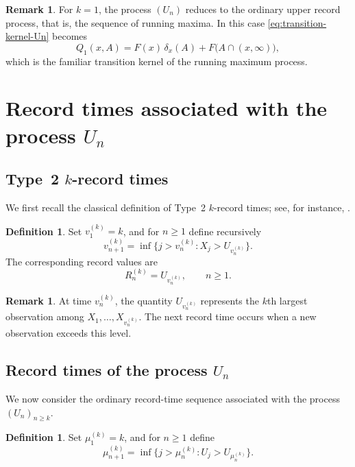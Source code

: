 \documentclass[12pt]{article}
\theoremstyle{definition}
\newtheorem{definition}[theorem]{Definition}
\newtheorem{remark}[theorem]{Remark}
\begin{document}
\begin{remark}
\label{rem:kernel-special-case-k1}
For $k=1$, the process $(U_n)$ reduces to the ordinary upper record process, that is, the sequence of running maxima. In this case \eqref{eq:transition-kernel-Un} becomes
\[
Q_1(x,A)=F(x)\,\delta_x(A)+F\bigl(A\cap(x,\infty)\bigr),
\]
which is the familiar transition kernel of the running maximum process.
\end{remark}

\section{Record times associated with the process $U_n$}\label{sec:record-times}
\subsection{Type~2 $k$-record times}
\label{subsec:type2-k-record-times}

We first recall the classical definition of Type~2 $k$-record times; see, for instance, \cite{ArnoldBalakrishnanNagaraja1998,AhmadiDoostparast2008}.

\begin{definition}
\label{def:type2-k-record-times-section4}
Set $v_1^{(k)}=k$, and for $n\ge1$ define recursively
\[
v_{n+1}^{(k)}
=
\inf\{j>v_n^{(k)}:X_j>U_{v_n^{(k)}}\}.
\]
The corresponding record values are
\[
R_n^{(k)}=U_{v_n^{(k)}}, \qquad n\ge1.
\]
\end{definition}

\begin{remark}
\label{rem:interpretation-k-records}
At time $v_n^{(k)}$, the quantity $U_{v_n^{(k)}}$ represents the $k$th largest observation among $X_1,\dots,X_{v_n^{(k)}}$. The next record time occurs when a new observation exceeds this level.
\end{remark}

\subsection{Record times of the process $U_n$}
\label{subsec:record-times-Un}

We now consider the ordinary record-time sequence associated with the process $(U_n)_{n\ge k}$.

\begin{definition}
\label{def:record-times-Un-section4}
Set $\mu_1^{(k)}=k$, and for $n\ge1$ define
\[
\mu_{n+1}^{(k)}
=
\inf\{j>\mu_n^{(k)}:U_j>U_{\mu_n^{(k)}}\}.
\]
\end{definition}
\end{document}
